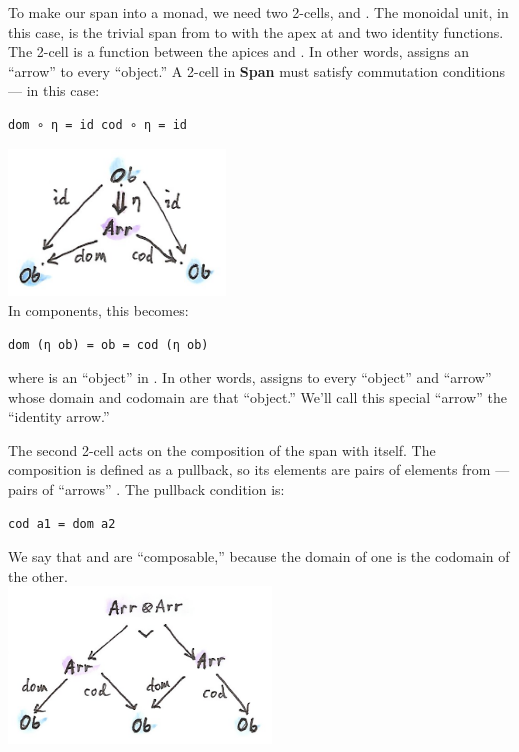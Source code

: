 To make our span into a monad, we need two 2-cells,  and
. The monoidal unit, in this case, is the trivial span from
 to  with the apex at  and two identity
functions. The 2-cell  is a function between the apices
 and . In other words,  assigns an
``arrow'' to every ``object.'' A 2-cell in \textbf{Span} must satisfy
commutation conditions --- in this case:

\begin{verbatim}
dom ∘ η = id cod ∘ η = id
\end{verbatim}

\includegraphics[width=2.27083in]{images/spanunit.png}\\
In components, this becomes:

\begin{verbatim}
dom (η ob) = ob = cod (η ob)
\end{verbatim}

where  is an ``object'' in . In other words,
 assigns to every ``object'' and ``arrow'' whose domain and
codomain are that ``object.'' We'll call this special ``arrow'' the
``identity arrow.''

The second 2-cell  acts on the composition of the span
 with itself. The composition is defined as a pullback, so
its elements are pairs of elements from  --- pairs of
``arrows'' . The pullback condition is:

\begin{verbatim}
cod a1 = dom a2
\end{verbatim}

We say that  and  are ``composable,'' because the
domain of one is the codomain of the other.\\
\includegraphics[width=2.75000in]{images/spanmul.png}

